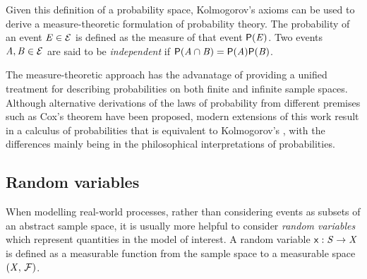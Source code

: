 Given this definition of a probability space, Kolmogorov's axioms \citep{} can be used to derive a measure-theoretic formulation of probability theory. The probability of an event $\mathit{E} \in \mathcal{E}$ is defined as the measure of that event $\mathsf{P}(\mathit{E})$. Two events $\mathit{A},\mathit{B} \in \mathcal{E}$ are said to be \emph{independent} if $\mathsf{P}(\mathit{A}\cap\mathit{B}) = \mathsf{P}(\mathit{A})\mathsf{P}(\mathit{B})$.

The measure-theoretic approach has the advanatage of providing a unified treatment for describing probabilities on both finite and infinite sample spaces. Although alternative derivations of the laws of probability from different premises such as Cox's theorem \citep{} have been proposed, modern extensions of this work result in a calculus of probabilities that is equivalent to Kolmogorov's \citep{}, with the differences mainly being in the philosophical interpretations of probabilities.

\subsection{Random variables}\label{subsec:random-variables}

When modelling real-world processes, rather than considering events as subsets of an abstract sample space, it is usually more helpful to consider \emph{random variables} which represent quantities in the model of interest. A random variable $\mathsf{x} : \mathit{S} \to \mathit{X}$ is defined as a measurable function from the sample space to a measurable space $(\mathit{X},\,\mathcal{F})$. 

